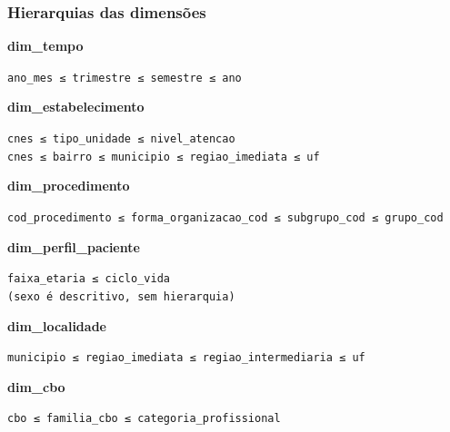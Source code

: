 \documentclass[12pt,a4paper]{article}
\newenvironment{hierarquias}{\par\nopagebreak\leftskip=20pt\small\setlength{\parskip}{0pt}}{\par\medskip}
\begin{document}
\subsubsection*{Hierarquias das dimensões}

\textbf{dim\_\allowbreak{}tempo}\par\nopagebreak\smallskip

\begin{hierarquias}\texttt{ano\_\allowbreak{}mes ≤ trimestre ≤ semestre ≤ ano}\end{hierarquias}

\textbf{dim\_\allowbreak{}estabelecimento}\par\nopagebreak\smallskip

\begin{hierarquias}\texttt{cnes ≤ tipo\_\allowbreak{}unidade ≤ nivel\_\allowbreak{}atencao}\\\texttt{cnes ≤ bairro ≤ municipio ≤ regiao\_\allowbreak{}imediata ≤ uf}\end{hierarquias}

\textbf{dim\_\allowbreak{}procedimento}\par\nopagebreak\smallskip

\begin{hierarquias}\texttt{cod\_\allowbreak{}procedimento ≤ forma\_\allowbreak{}organizacao\_\allowbreak{}cod ≤ subgrupo\_\allowbreak{}cod ≤ grupo\_\allowbreak{}cod}\end{hierarquias}

\textbf{dim\_\allowbreak{}perfil\_\allowbreak{}paciente}\par\nopagebreak\smallskip

\begin{hierarquias}\texttt{faixa\_\allowbreak{}etaria ≤ ciclo\_\allowbreak{}vida}\\\texttt{(sexo é descritivo, sem hierarquia)}\end{hierarquias}

\textbf{dim\_\allowbreak{}localidade}\par\nopagebreak\smallskip

\begin{hierarquias}\texttt{municipio ≤ regiao\_\allowbreak{}imediata ≤ regiao\_\allowbreak{}intermediaria ≤ uf}\end{hierarquias}

\textbf{dim\_\allowbreak{}cbo}\par\nopagebreak\smallskip

\begin{hierarquias}\texttt{cbo ≤ familia\_\allowbreak{}cbo ≤ categoria\_\allowbreak{}profissional}\end{hierarquias}
\end{document}
